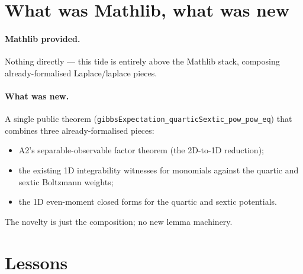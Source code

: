 \documentclass[11pt]{article}
\begin{document}
\section{What was Mathlib, what was new}

\paragraph{Mathlib provided.} Nothing directly — this tide is
entirely above the Mathlib stack, composing already-formalised
Laplace/laplace pieces.

\paragraph{What was new.} A single public theorem
(\texttt{gibbsExpectation\_quarticSextic\_pow\_pow\_eq}) that
combines three already-formalised pieces:

\begin{itemize}[leftmargin=1em,itemsep=0.2em]
\item A2's separable-observable factor theorem (the 2D-to-1D
  reduction);
\item the existing 1D integrability witnesses for monomials against
  the quartic and sextic Boltzmann weights;
\item the 1D even-moment closed forms for the quartic and sextic
  potentials.
\end{itemize}

\noindent The novelty is just the composition; no new lemma machinery.

\section{Lessons}
\end{document}
